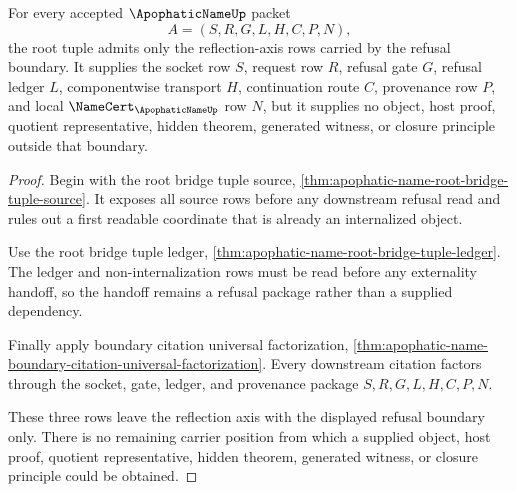 \begin{theorem}
\label{thm:apophatic-name-root-reflection-axis-refusal}
For every accepted $\ApophaticNameUp$ packet
$$
A=(S,R,G,L,H,C,P,N),
$$
the root tuple admits only the reflection-axis rows carried by the refusal boundary. It supplies the socket row $S$, request row $R$, refusal gate $G$, refusal ledger $L$, componentwise transport $H$, continuation route $C$, provenance row $P$, and local $\NameCert_{\ApophaticNameUp}$ row $N$, but it supplies no object, host proof, quotient representative, hidden theorem, generated witness, or closure principle outside that boundary.
\end{theorem}
\begin{proof}
Begin with the root bridge tuple source, \autoref{thm:apophatic-name-root-bridge-tuple-source}. It exposes all source rows before any downstream refusal read and rules out a first readable coordinate that is already an internalized object.

Use the root bridge tuple ledger, \autoref{thm:apophatic-name-root-bridge-tuple-ledger}. The ledger and non-internalization rows must be read before any externality handoff, so the handoff remains a refusal package rather than a supplied dependency.

Finally apply boundary citation universal factorization, \autoref{thm:apophatic-name-boundary-citation-universal-factorization}. Every downstream citation factors through the socket, gate, ledger, and provenance package $S,R,G,L,H,C,P,N$.

These three rows leave the reflection axis with the displayed refusal boundary only. There is no remaining carrier position from which a supplied object, host proof, quotient representative, hidden theorem, generated witness, or closure principle could be obtained.
\end{proof}

